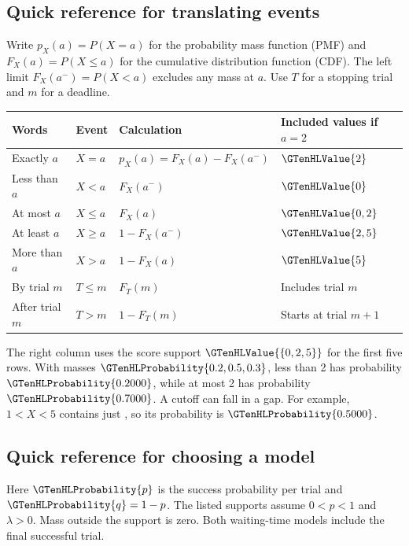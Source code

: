 \newpage
\backtomap
{}
\subsection*{Quick reference for translating events}

Write \(p_X(a)=P(X=a)\) for the probability mass function (PMF) and
\(F_X(a)=P(X\leq a)\) for the cumulative distribution function (CDF).
The left limit \(F_X(a^-)=P(X<a)\) excludes any mass at \(a\).
Use \(T\) for a stopping trial and \(m\) for a deadline.

\begin{tabularx}{\linewidth}{@{}l l l L@{}}
\toprule
\textbf{Words} & \textbf{Event} & \textbf{Calculation} & \textbf{Included values if \(a=2\)}\\
\midrule
Exactly \(a\) & \(X=a\) & \(p_X(a)=F_X(a)-F_X(a^-)\) & \(\GTenHLValue{2}\)\\
Less than \(a\) & \(X<a\) & \(F_X(a^-)\) & \(\GTenHLValue{0}\)\\
At most \(a\) & \(X\leq a\) & \(F_X(a)\) & \(\GTenHLValue{0,2}\)\\
At least \(a\) & \(X\geq a\) & \(1-F_X(a^-)\) & \(\GTenHLValue{2,5}\)\\
More than \(a\) & \(X>a\) & \(1-F_X(a)\) & \(\GTenHLValue{5}\)\\
By trial \(m\) & \(T\leq m\) & \(F_T(m)\) & Includes trial \(m\)\\
After trial \(m\) & \(T>m\) & \(1-F_T(m)\) & Starts at trial \(m+1\)\\
\bottomrule
\end{tabularx}

The right column uses the  score support \(\GTenHLValue{\{0,2,5\}}\) for the first five rows. With masses \(\GTenHLProbability{0.2,0.5,0.3}\), less than 2 has probability \(\GTenHLProbability{0.2000}\), while at most 2 has probability \(\GTenHLProbability{0.7000}\). A cutoff can fall in a gap. For example, \(1<X<5\) contains just , so its probability is \(\GTenHLProbability{0.5000}\).

\subsection*{Quick reference for choosing a model}
Here \(\GTenHLProbability{p}\) is the success probability per trial and \(\GTenHLProbability{q}=1-p\). The listed supports assume \(0<p<1\) and \(\lambda>0\). Mass outside the support is zero. Both waiting-time models include the final successful trial.


